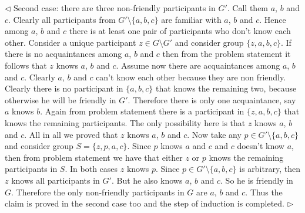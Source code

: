 \documentclass[12pt]{article}
\newenvironment{solution}{\par $\triangleleft$}{$\triangleright$}
\begin{document}
\begin{solution}
Second case: there are three non-friendly participants in $G'$. Call them $a$, $b$ and $c$. Clearly all participants from $G'\setminus\{a,b,c\}$ are familiar with $a$, $b$ and $c$. Hence among $a$, $b$ and $c$ there is at least one pair of participants who don't know each other. Consider a unique participant $z\in G\setminus G'$ and consider group $\{z,a,b,c\}$. If there is no acquaintances among $a$, $b$ and $c$ then from the problem statement it follows that $z$ knows $a$, $b$ and $c$. Assume now there are acquaintances among $a$, $b$ and $c$. Clearly $a$, $b$ and $c$ can't know each other because they are non friendly. Clearly there is no participant in $\{a,b,c\}$ that knows the remaining two, because otherwise he will be friendly in $G'$. Therefore there is only one acquaintance, say $a$ knows $b$. Again from problem statement there is a participant in $\{z,a,b,c\}$ that knows the remaining participants. The only possibility here is that $z$ knows $a$, $b$ and $c$. All in all we proved that $z$ knows $a$, $b$ and $c$. Now take any $p\in G'\setminus\{a,b,c\}$ and consider group $S=\{z,p,a,c\}$. Since $p$ knows $a$ and $c$ and $c$ doesn't know $a$, then from problem statement we have that either $z$ or $p$ knows the remaining participants in $S$. In both cases $z$ knows $p$. Since $p\in G'\setminus\{a,b,c\}$ is arbitrary, then $z$ knows all participants in $G'$. But he also knows $a$, $b$ and $c$. So he is friendly in $G$. Therefore the only non-friendly participants in $G$ are $a$, $b$ and $c$. Thus the claim is proved in the second case too and the step of induction is completed.
\end{solution}
 
\end{document}

